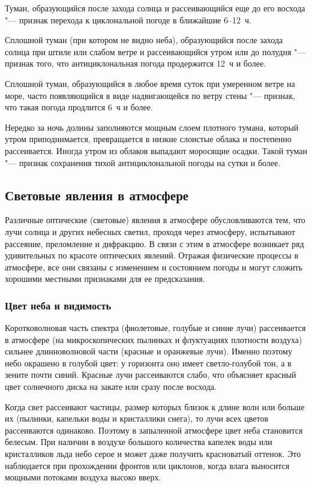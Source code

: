  Туман, образующийся после захода солнца и рассеивающийся еще
до его восхода "--- признак перехода к циклональной погоде в ближайшие
6--12~ч.

 Сплошной туман (при котором не видно неба), образующийся после
захода солнца при штиле или слабом ветре и рассеивающийся утром или до
полудня "--- признак того, что антициклональная погода продержится 12~ч и
более.

 Сплошной туман, образующийся в любое время суток при умеренном
ветре на море, часто появляющийся в виде надвигающейся по ветру стены
"--- признак, что такая погода продлится 6~ч и более.

 Нередко за ночь долины заполняются мощным слоем плотного
тумана, который утром приподнимается, превращается в низкие слоистые
облака и постепенно рассеивается. Иногда утром из облаков выпадают
моросящие осадки. Такой туман "--- признак сохранения тихой
антициклональной погоды на сутки и более.

\subsection{Световые явления в атмосфере}

Различные оптические (световые) явления в атмосфере обусловливаются
тем, что лучи солнца и других небесных светил, проходя через
атмосферу, испытывают рассеяние, преломление и дифракцию. В связи с
этим в атмосфере возникает ряд удивительных по красоте оптических
явлений. Отражая физические процессы в атмосфере, все они связаны с
изменением и состоянием погоды и могут сложить хорошими местными
признаками для ее предсказания.

\subsubsection{Цвет неба и видимость}

Коротковолновая часть спектра (фиолетовые, голубые и синие лучи)
рассеивается в атмосфере (на микроскопических пылинках и флуктуациях
плотности воздуха) сильнее длинноволновой части (красные и оранжевые
лучи). Именно поэтому небо окрашено в голубой цвет: у горизонта оно
имеет светло-голубой тон, а в зените почти синий. Красные лучи
рассеиваются слабо, что объясняет красный цвет солнечного диска на
закате или сразу после восхода.

Когда свет рассеивают частицы, размер которых близок к длине волн или
больше их (пылинки, капельки воды и кристаллики снега), то лучи всех
цветов рассеиваются одинаково. Поэтому в запыленной атмосфере цвет
неба становится белесым. При наличии в воздухе большого количества
капелек воды или кристалликов льда небо серое и может даже получить
красноватый оттенок. Это наблюдается при прохождении фронтов или
циклонов, когда влага выносится мощными потоками воздуха высоко вверх.

